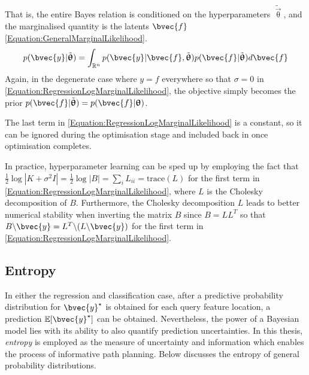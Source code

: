 \begin{equation}
				\label{Equation:RegressionLogMarginalLikelihoodBayes}
				\end{equation} That is, the entire Bayes relation is conditioned on the hyperparameters $\tilde{\vec{\uptheta}}$, and the marginalised quantity is the latents $\bvec{f}$ \eqref{Equation:GeneralMarginalLikelihood}. \begin{equation}
					p(\bvec{y} | \tilde{\vec{\uptheta}}) = \int_{\mathbb{R}^{n}} p(\bvec{y} | \bvec{f}, \tilde{\vec{\uptheta}}) p(\bvec{f} | \tilde{\vec{\uptheta}}) d\bvec{f}
				\label{Equation:GeneralMarginalLikelihood}
				\end{equation} Again, in the degenerate case where $y = f$ everywhere so that $\sigma = 0$ in \eqref{Equation:RegressionLogMarginalLikelihood}, the objective simply becomes the prior $p(\bvec{f} | \tilde{\vec{\uptheta}}) = p(\bvec{f} | \vec{\uptheta})$.
				
				The last term in \eqref{Equation:RegressionLogMarginalLikelihood} is a constant, so it can be ignored during the optimisation stage and included back in once optimisation completes.
				
				In practice, hyperparameter learning can be sped up by employing the fact that $\frac{1}{2} \log|K + \sigma^{2} I| = \frac{1}{2} \log|B| = \sum_{i} L_{ii} = \mathrm{trace}(L)$ for the first term in \eqref{Equation:RegressionLogMarginalLikelihood}, where $L$ is the Cholesky decomposition of $B$. Furthermore, the Cholesky decomposition $L$ leads to better numerical stability when inverting the matrix $B$ since $B = LL^{T}$ so that $B \backslash \bvec{y} = L^{T} \backslash (L \backslash \bvec{y})$ for the first term in \eqref{Equation:RegressionLogMarginalLikelihood}.
		
		\subsection{Entropy}
		\label{Background:GaussianProcesses:Entropy}
		
			In either the regression and classification case, after a predictive probability distribution for $\bvec{y}^{\star}$ is obtained for each query feature location, a prediction $\mathbb{E}[\bvec{y}^{\star}]$ can be obtained. Nevertheless, the power of a Bayesian model lies with its ability to also quantify prediction uncertainties. In this thesis, \textit{entropy} is employed as the measure of uncertainty and information which enables the process of informative path planning. Below discusses the entropy of general probability distributions.
			
